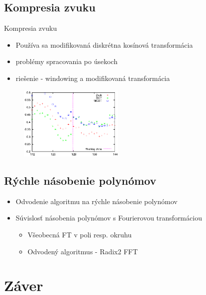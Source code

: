 \documentclass{beamer}
\begin{document}
\subsection{Kompresia zvuku}
\begin{frame}{Kompresia zvuku}
    \begin{itemize}
        \item Používa sa modifikovaná diskrétna kosínová transformácia
            \item problémy spracovania po úsekoch
            \item riešenie - windowing a modifikovaná transformácia
    \end{itemize}
    \begin{figure}
        \includegraphics[width=5cm]{obrazky/dct_vs_mdct}
    \end{figure}
\end{frame}

\subsection{Rýchle násobenie polynómov}
\begin{frame}
    \begin{itemize}
        \item Odvodenie algoritmu na rýchle násobenie polynómov
        \item Súvislosť násobenia polynómov s Fourierovou
        transformáciou
            \begin{itemize}
                \item Všeobecná FT v poli resp. okruhu
                \item Odvodený algoritmus - Radix2 FFT
            \end{itemize}
    \end{itemize}
\end{frame}


\section{Záver}
\end{document}
